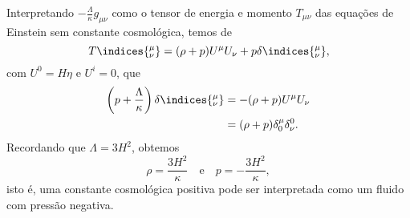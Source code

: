 Interpretando \(- \frac{\Lambda}{\kappa} g_{\mu\nu}\) como o tensor de energia e momento \(T_{\mu\nu}\) das equações de Einstein sem constante cosmológica, temos de
\begin{equation*}
    T\indices{^\mu_\nu} = (\rho + p) U^\mu U_\nu + p \delta\indices{^\mu_\nu},
\end{equation*}
com \(U^0 = H \eta\) e \(U^i = 0\), que
\begin{align*}
    \left(p + \frac{\Lambda}{\kappa}\right) \delta\indices{^\mu_\nu} &= -(\rho + p) U^\mu U_\nu\\
                                                                     &= (\rho + p) \delta^\mu_0 \delta^0_\nu.
\end{align*}
Recordando que \(\Lambda = 3H^2\), obtemos
\begin{equation*}
    \rho = \frac{3 H^2}{\kappa}\quad\text{e}\quad
    p = -\frac{3H^2}{\kappa},
\end{equation*}
isto é, uma constante cosmológica positiva pode ser interpretada como um fluido com pressão negativa.
